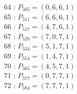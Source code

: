 \documentclass{article}
\begin{document}
{\begin{multicols}{3}
64 : $P_{505}=( 0, 6, 6, 1 )$\\
65 : $P_{511}=( 6, 6, 6, 1 )$\\
66 : $P_{517}=( 4, 7, 6, 1 )$\\
67 : $P_{528}=( 7, 0, 7, 1 )$\\
68 : $P_{534}=( 5, 1, 7, 1 )$\\
69 : $P_{554}=( 1, 4, 7, 1 )$\\
70 : $P_{565}=( 4, 5, 7, 1 )$\\
71 : $P_{577}=( 0, 7, 7, 1 )$\\
72 : $P_{584}=( 7, 7, 7, 1 )$\\
\end{multicols}


%


%


}%
\end{document}
